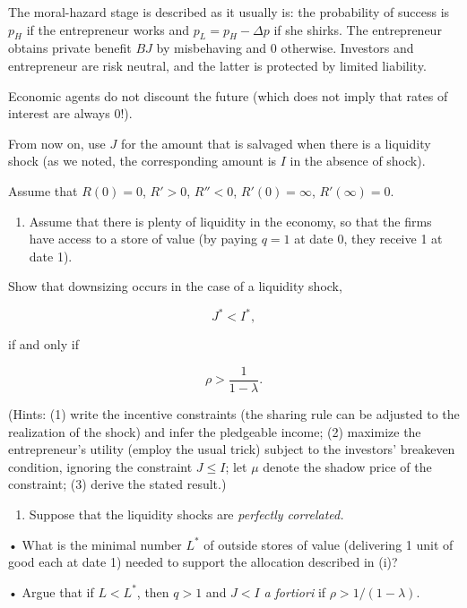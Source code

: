 \documentclass[11pt,a4paper]{article}
\providecommand{\tightlist}{\setlength{\itemsep}{0pt}\setlength{\parskip}{0pt}}
\begin{document}
The moral-hazard stage is described as it usually is: the probability of success is \(p_H\) if the
entrepreneur works and \(p_L = p_H - \Delta p\) if she shirks. The entrepreneur obtains private
benefit \(BJ\) by misbehaving and 0 otherwise. Investors and entrepreneur are risk neutral, and the
latter is protected by limited liability.

Economic agents do not discount the future (which does not imply that rates of interest are always
0!).

From now on, use \(J\) for the amount that is salvaged when there is a liquidity shock (as we noted,
the corresponding amount is \(I\) in the absence of shock).

Assume that \(R(0) = 0\), \(R' > 0\), \(R'' < 0\), \(R'(0) = \infty\), \(R'(\infty) = 0\).

\begin{enumerate}
\def\labelenumi{(\roman{enumi})}
\tightlist
\item
  Assume that there is plenty of liquidity in the economy, so that the firms have access to a store
  of value (by paying \(q = 1\) at date 0, they receive 1 at date 1).
\end{enumerate}

Show that downsizing occurs in the case of a liquidity shock,

\[J^* < I^*,\]

if and only if

\[\rho > \frac{1}{1 - \lambda}.\]

(Hints: (1) write the incentive constraints (the sharing rule can be adjusted to the realization of
the shock) and infer the pledgeable income; (2) maximize the entrepreneur's utility (employ the
usual trick) subject to the investors' breakeven condition, ignoring the constraint
\(J \leqslant I\); let \(\mu\) denote the shadow price of the constraint; (3) derive the stated
result.)

\begin{enumerate}
\def\labelenumi{(\roman{enumi})}
\setcounter{enumi}{1}
\tightlist
\item
  Suppose that the liquidity shocks are \emph{perfectly correlated.}
\end{enumerate}

• What is the minimal number \(L^*\) of outside stores of value (delivering 1 unit of good each at
date 1) needed to support the allocation described in (i)?

• Argue that if \(L < L^*\), then \(q > 1\) and \(J < I\) \emph{a fortiori} if
\(\rho > 1/(1 - \lambda)\).
\end{document}
